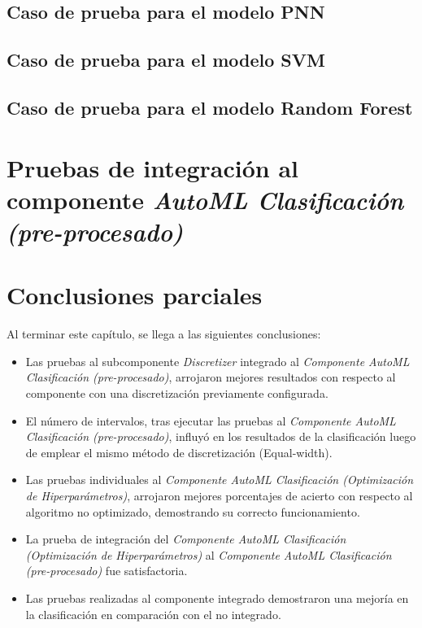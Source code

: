 \subsection{Caso de prueba para el modelo PNN}

\subsection{Caso de prueba para el modelo SVM}

\subsection{Caso de prueba para el modelo Random Forest}

\section{Pruebas de integración al componente \textit{AutoML Clasificación (pre-procesado)}}



\section{Conclusiones parciales}
Al terminar este capítulo, se llega a las siguientes conclusiones:
\begin{itemize}
	\item Las pruebas al subcomponente \textit{Discretizer} integrado al \textit{Componente AutoML Clasificación (pre-procesado)}, arrojaron mejores resultados con respecto al componente con una discretización previamente configurada.
	\item El número de intervalos, tras ejecutar las pruebas al \textit{Componente AutoML Clasificación (pre-procesado)}, influyó en los resultados de la clasificación luego de emplear el mismo método de discretización (Equal-width).
	\item Las pruebas individuales al \textit{Componente AutoML Clasificación (Optimización de Hiperparámetros)}, arrojaron mejores porcentajes de acierto con respecto al algoritmo no optimizado, demostrando su correcto funcionamiento.
	\item La prueba de integración del \textit{Componente AutoML Clasificación (Optimización de Hiperparámetros)} al \textit{Componente AutoML Clasificación (pre-procesado)} fue satisfactoria.
	\item Las pruebas realizadas al componente integrado demostraron una mejoría en la clasificación en comparación con el no integrado.
\end{itemize}
\pagebreak
